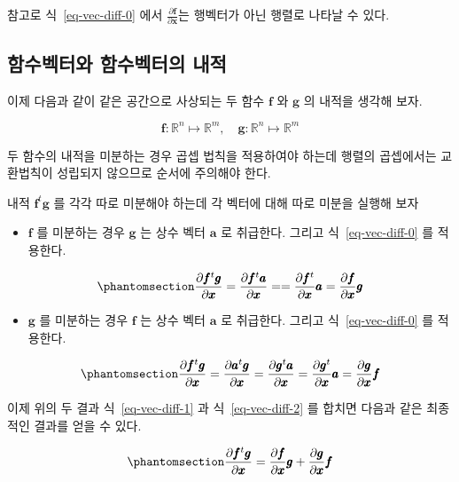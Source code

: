 \documentclass[
  11pt,
  a4paper,
  oneside]{scrbook}
\providecommand{\tightlist}{%
  \setlength{\itemsep}{0pt}\setlength{\parskip}{0pt}}\usepackage{longtable,booktabs,array}
\newcommand{\RR}{\mathbb{R}}
\newcommand{\pardifftwo}[2]{\frac{\partial #1}{\partial #2 }}
\theoremstyle{definition}
\theoremstyle{plain}
\theoremstyle{definition}
\theoremstyle{definition}
\theoremstyle{remark}
\begin{document}
참고로 식~\ref{eq-vec-diff-0} 에서 \(\pardifftwo{  \pmb f}{\pmb x}\)는
행벡터가 아닌 행렬로 나타날 수 있다.

\subsection{함수벡터와 함수벡터의
내적}\label{uxd568uxc218uxbca1uxd130uxc640-uxd568uxc218uxbca1uxd130uxc758-uxb0b4uxc801}

이제 다음과 같이 같은 공간으로 사상되는 두 함수 \(\pmb f\) 와 \(\pmb g\)
의 내적을 생각해 보자.

\[ \pmb f : \RR^n \mapsto \RR^m, \quad \pmb g : \RR^n \mapsto \RR^m\]

두 함수의 내적을 미분하는 경우 곱셉 법칙을 적용하여야 하는데 행렬의
곱셉에서는 교환법칙이 성립되지 않으므로 순서에 주의해야 한다.

내적 \(\pmb f^t \pmb g\) 를 각각 따로 미분해야 하는데 각 벡터에 대해
따로 미분을 실행해 보자

\begin{itemize}
\tightlist
\item
  \(\pmb f\) 를 미분하는 경우 \(\pmb g\) 는 상수 벡터 \(\pmb a\) 로
  취급한다. 그리고 식~\ref{eq-vec-diff-0} 를 적용한다.
\end{itemize}

\begin{equation}\phantomsection\label{eq-vec-diff-1}{
\pardifftwo{ \pmb f^t \pmb g}{\pmb x} = \pardifftwo{ \pmb f^t \pmb a}{\pmb x} = 
=  \pardifftwo{ \pmb f^t}{\pmb x} \pmb a=
\pardifftwo{ \pmb f}{\pmb x} \pmb g
}\end{equation}

\begin{itemize}
\tightlist
\item
  \(\pmb g\) 를 미분하는 경우 \(\pmb f\) 는 상수 벡터 \(\pmb a\) 로
  취급한다. 그리고 식~\ref{eq-vec-diff-0} 를 적용한다.
\end{itemize}

\begin{equation}\phantomsection\label{eq-vec-diff-2}{
\pardifftwo{ \pmb f^t \pmb g}{\pmb x} = \pardifftwo{ \pmb a^t \pmb g}{\pmb x} = 
\pardifftwo{ \pmb g^t \pmb a}{\pmb x} = 
 \pardifftwo{ \pmb g^t}{\pmb x}  \pmb a =
 \pardifftwo{ \pmb g}{\pmb x} \pmb f 
}\end{equation}

이제 위의 두 결과 식~\ref{eq-vec-diff-1} 과 식~\ref{eq-vec-diff-2} 를
합치면 다음과 같은 최종적인 결과를 얻을 수 있다.

\begin{equation}\phantomsection\label{eq-vec-diff-prod}{
\pardifftwo{ \pmb f^t \pmb g}{\pmb x} =  \pardifftwo{ \pmb f}{\pmb x} \pmb g +  \pardifftwo{ \pmb g}{\pmb x} \pmb f
}\end{equation}
\end{document}
